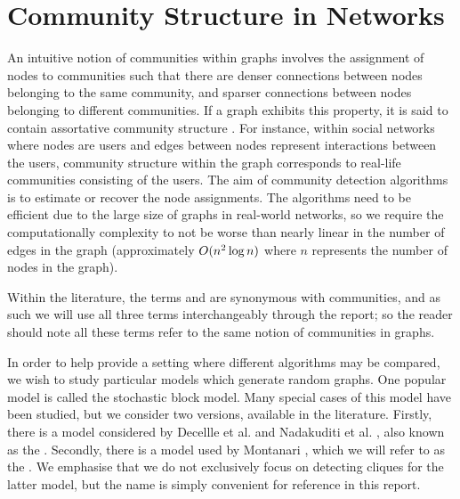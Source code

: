 
\section{Community Structure in Networks}
\label{sec:communityStructureBackground}

An intuitive notion of communities within graphs involves the assignment of nodes to communities such that there are denser connections between nodes belonging to the same community, and sparser connections between nodes belonging to different communities. If a graph exhibits this property, it is said to contain assortative community structure \cite{New06a,DKM+13,For10,New06b}.
For instance, within social networks where nodes are users and edges between nodes represent interactions between the users, community structure within the graph corresponds to real-life communities consisting of the users.
The aim of community detection algorithms is to estimate or recover the node assignments. The algorithms need to be efficient due to the large size of graphs in real-world networks, so we require the computationally complexity to not be worse than nearly linear in the number of edges in the graph (approximately $O(n^{2}\log n)$ where $n$ represents the number of nodes in the graph).

Within the literature, the terms  and  are synonymous with communities, and as such we will use all three terms interchangeably through the report; so the reader should note all these terms refer to the same notion of communities in graphs.

In order to help provide a setting where different algorithms may be compared, we wish to study particular models which generate random graphs. One popular model is called the stochastic block model.
Many special cases of this model have been studied, but we consider two versions, available in the literature.
Firstly, there is a model considered by Decellle et al. \cite{DKM+13} and Nadakuditi et al. \cite{NN12}, also known as the .
Secondly, there is a model used by Montanari \cite{DM13,Mon13}, which we will refer to as the . We emphasise that we do not exclusively focus on detecting cliques for the latter model, but the name is simply convenient for reference in this report.

